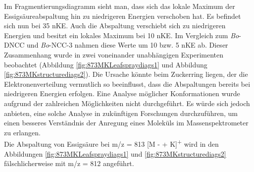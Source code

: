 Im Fragmentierungsdiagramm sieht man, dass sich das lokale Maximum der Essigsäureabspaltung hin zu niedrigeren Energien verschoben hat. Es befindet sich nun bei  35 \gls{nKE}. Auch die  Abspaltung verschiebt sich zu niedrigeren Energien und besitzt ein lokales Maximum bei 10 \gls{nKE}. Im Vergleich zum \textit{Bo}-DNCC und \textit{Bo}-NCC-3 nahmen diese Werte um 10 bzw. 5 \gls{nKE} ab. Dieser Zusammenhang wurde in zwei voneinander unabhängigen Experimenten beobachtet (Abbildung \ref{fig:873MKLeafspraydiags1} und Abbildung \ref{fig:873MKstructurediags2}). Die Ursache könnte beim Zuckerring liegen, der die Elektronenverteilung vermutlich so beeinflusst, dass die Abspaltungen bereits bei niedrigeren Energien erfolgen. Eine Analyse möglicher Konformationen wurde aufgrund der zahlreichen Möglichkeiten nicht durchgeführt. Es würde sich jedoch anbieten, eine solche Analyse in zukünftigen Forschungen durchzuführen, um einen besseres Verständnis der Anregung eines Moleküls im Massenspektrometer zu erlangen. \\

Die Abspaltung von Essigsäure bei m/z = 813 [M -  + K]\textsuperscript{+} wird in den Abbildungen \ref{fig:873MKLeafspraydiags1} und \ref{fig:873MKstructurediags2} fälschlicherweise mit m/z = 812 angeführt. 

